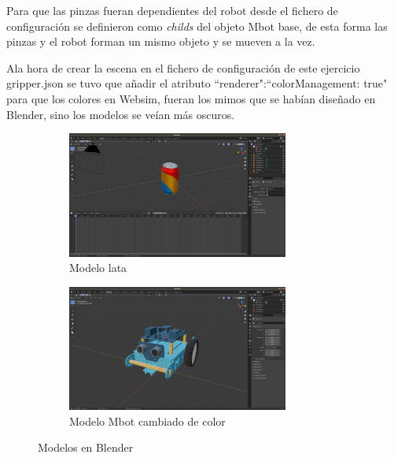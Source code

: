  Para que las pinzas fueran dependientes del robot desde el fichero de configuración se definieron como \textit{childs} del objeto Mbot base, de esta forma las pinzas y el robot forman un mismo objeto y se mueven a la vez.

Ala hora de crear la escena en el fichero de configuración de este ejercicio gripper.json se tuvo que añadir el atributo ``renderer":``colorManagement: true"  para que los colores en Websim, fueran los mimos que se habían diseñado en Blender, sino los modelos se veían más oscuros. 

\begin{figure}[H]
  \begin{subfigure}[b]{0.5\textwidth}
  \centering
    \includegraphics[width=0.8\textwidth, height=0.5\textwidth]{chapters/images/lata.png}
    \caption{Modelo lata}
    \label{fig:f1}
  \end{subfigure}
  \hfill
  \begin{subfigure}[b]{0.5\textwidth}
  \centering
    \includegraphics[width=0.8\textwidth, height=0.5\textwidth]{chapters/images/mbotbase.png}
	\caption{Modelo Mbot cambiado de color}    
    \label{fig:f2}
 
  \end{subfigure}
  \caption{Modelos en Blender}
\end{figure}

